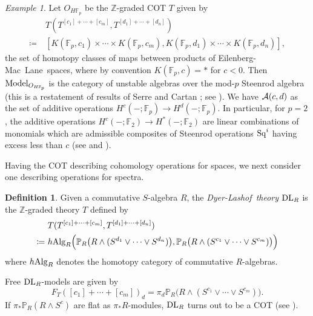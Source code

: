 \documentclass{gtpart}
\theoremstyle{definition}
\newtheorem{defn}[thm]{Definition}
\theoremstyle{remark}
\newtheorem{ex}[thm]{Example}
\newcommand{\mb}[1]{\mathbb{#1}}
\newcommand{\Alg}{{\rm Alg}}
\newcommand{\dl}{{\rm DL}}
\newcommand{\Sq}{{\rm Sq}}
\newcommand{\Model}{{\rm Model}}
\newcommand{\DL}{Dyer-Lashof~}
\newcommand{\EM}{Eilenberg-Mac~Lane~}
\newcommand{\BF}{{\mb F}}
\newcommand{\BP}{{\mb P}}
\newcommand{\BZ}{{\mb Z}}
\newcommand{\ce}{\coloneqq}
\numberwithin{equation}{section}
\numberwithin{thm}{section}
\begin{document}
\begin{ex}
\label{ex:Sq}
 Let $O_{H\BF_p}$ be the $\BZ$-graded COT $T$ given by 
 \begin{equation*}
 \begin{split}
      & ~ T(T^{[c_1]+\cdots+[c_m]}, T^{[d_1]+\cdots+[d_n]}) \\
  \ce & ~ [K(\BF_p,c_1) \times \cdots \times K(\BF_p,c_m), K(\BF_p,d_1) \times \cdots \times K(\BF_p,d_n)], 
 \end{split}
 \end{equation*}
 the set of homotopy classes of maps between products of \EM spaces, 
 where by convention $K(\BF_p,c) = *$ for $c<0$.  Then 
 $\Model_{O_{H\BF_p}}$ is the category of unstable algebras over the 
 mod-$p$ Steenrod algebra (this is a restatement of results of Serre 
 \cite{serre} and Cartan \cite{cartan}; see 
 \cite[Section II.5]{steenrod}).  We have ${\cal A}(c,d)$ as the set of 
 additive operations $H^c(-;\BF_p) \to H^d(-;\BF_p)$.  In particular, 
 for $p=2$, the additive operations $H^c(-;\BF_2) \to H^*(-;\BF_2)$ are 
 linear combinations of monomials which are admissible composites of 
 Steenrod operations $\Sq^i$ having excess less than $c$ (see 
 \cite[Theorem 2 of Section 4]{serre} and 
 \cite[Chapters 3 and 9]{moshertangora}).  
\end{ex}

Having the COT describing cohomology operations for spaces, we next 
consider one describing operations for spectra.  

\begin{defn}
\label{def:DL}
 Given a commutative $S$-algebra $R$, the {\em \DL theory} $\dl_R$ is 
 the $\BZ$-graded theory $T$ defined by 
 \begin{equation*}
 \begin{split}
      & ~ T(T^{[c_1]+\cdots+[c_m]},T^{[d_1]+\cdots+[d_n]}) \\
  \ce & ~ h\Alg_R \Big(\BP_R \big(R \wedge (S^{d_1} \vee \cdots \vee S^{d_n}) \big), \BP_R \big(R \wedge (S^{c_1} \vee \cdots \vee S^{c_m}) \big) \Big) 
 \end{split}
 \end{equation*}
 where $h\Alg_R$ denotes the homotopy category of commutative 
 $R$-algebras.  
\end{defn}

Free $\dl_R$-models are given by 
\[
 F_T([c_1]+\cdots+[c_m])_d = \pi_d \BP_R \big( R \wedge 
 (S^{c_1} \vee \cdots \vee S^{c_m}) \big).  
\]
If $\pi_* \BP_R (R \wedge S^c)$ are flat as $\pi_*R$-modules, $\dl_R$ 
turns out to be a COT (see \cite[Lemma 7.5]{lpo}).  
\end{document}
